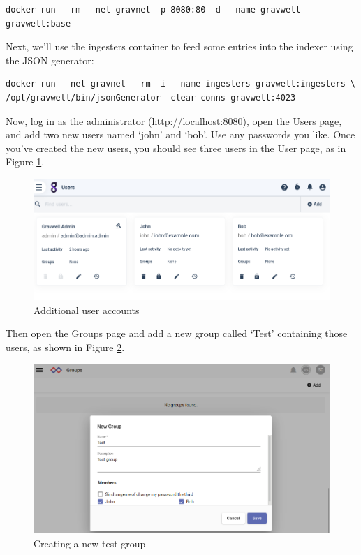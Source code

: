 \begin{Verbatim}[breaklines=true]
docker run --rm --net gravnet -p 8080:80 -d --name gravwell gravwell:base
\end{Verbatim}

Next, we'll use the ingesters container to feed some entries into the
indexer using the JSON generator:

\begin{Verbatim}[breaklines=true]
docker run --net gravnet --rm -i --name ingesters gravwell:ingesters \
/opt/gravwell/bin/jsonGenerator -clear-conns gravwell:4023
\end{Verbatim}

Now, log in as the administrator (\href{http://localhost:8080}{http://localhost:8080}), open the Users page, and add two new
users named `john' and `bob'. Use any passwords you like. Once you've
created the new users, you should see three users in the User page, as in Figure \ref{fig:lab-john-bob}.

\begin{figure}
	\includegraphics[width=0.7\linewidth]{images/lab-john-bob.png}
	\caption{Additional user accounts}
	\label{fig:lab-john-bob}
\end{figure}

Then open the Groups page and add a new group called `Test' containing
those users, as shown in Figure \ref{fig:lab-test-group}.

\begin{figure}
	\includegraphics[width=0.7\linewidth]{images/lab-test-group.png}
	\caption{Creating a new test group}
	\label{fig:lab-test-group}
\end{figure}

